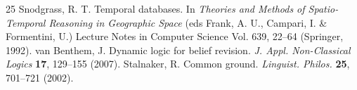 \begin{thebibliography}{25}
 Snodgrass, R. T. Temporal databases. In \emph{Theories and Methods of Spatio-Temporal Reasoning in Geographic Space} (eds Frank, A. U., Campari, I. \& Formentini, U.) Lecture Notes in Computer Science Vol. 639, 22--64 (Springer, 1992).
 van Benthem, J. Dynamic logic for belief revision. \emph{J. Appl. Non-Classical Logics} \textbf{17}, 129--155 (2007).
 Stalnaker, R. Common ground. \emph{Linguist. Philos.} \textbf{25}, 701--721 (2002).
\end{thebibliography}

